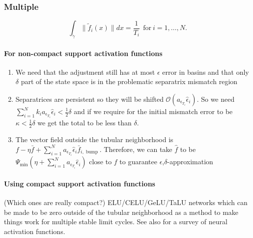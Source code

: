 \documentclass{article}
\newcommand{\ascomment}[1]{\textcolor{ascolor}{(#1)}}
\theoremstyle{definition} \newtheorem{definition}{Definition}
\theoremstyle{remark} \newtheorem{remark}{Remark}
\newcounter{ct}
\begin{document}
\subsubsection{Multiple}\label{sec:mlc_extras}
\begin{equation}\label{eq:nlc_constraints}
\int_{\tilde{\gamma}}\|\tilde{f}_i(x)\| dx = \frac{1}{T_i} \ \  \text{for} \ i=1,\dots, N. 	%
\end{equation}


\paragraph{For non-compact support activation functions}
\begin{enumerate}
\item We need that the adjustment still has at most $\epsilon$ error in basins and that only $\delta$ part of the state space is in the problematic separatrix mismatch region
\item Separatrices are persistent so they will be shifted $\mathcal{O}(a_{\epsilon_{T_i}}\hat \epsilon_i)$. So we need $\sum_{i=1}^{N}k_i a_{\epsilon_{T_i}}\hat \epsilon_i < \tfrac{1}{2}\delta$ and if we require for the initial mismatch error to be $\kappa<\tfrac{1}{2}\delta$ we get the total to be less than $\delta$. 
\item The vector field outside the tubular neighborhood is $f - \eta\bar f  + \sum_{i=1}^Na_{\epsilon_{T_i}}\hat \epsilon_i\bar f_{i,\operatorname{bump}}$. 
Therefore, we can take $\hat f$ to be  $\Psi_{\min}(\eta + \sum_{i=1}^Na_{\epsilon_{T_i}}\hat \epsilon_i)$ close to $f$ to guarantee $\epsilon$,$\delta$-approximation
\end{enumerate}

\paragraph{Using compact support activation functions}
\ascomment{Which ones are really compact?}
 ELU/CELU/GeLU/TaLU networks\citep{clevert2015elu,barron2017celu,elfwing2018sigmoid,hasan2023talu} which can be made to be zero outside of the tubular neighborhood as a method to make things work for multiple stable limit cycles.
See also \citep{duch1999survey,dubey2022activation,jagtap2023activation,ramachandran2017activation,hayou2019activation} for a survey of neural activation functions.
\end{document}

